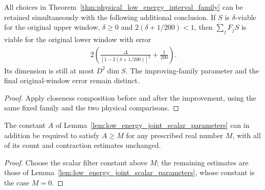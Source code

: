 \begin{corollary}
    \label{cor:physical_original_low_energy_interval_family}
    \leanok
    All choices in Theorem~\ref{thm:physical_low_energy_interval_family}
    can be retained simultaneously with the following additional conclusion.
    If $S$ is $\delta$-viable for the original upper window,
    $\delta\ge0$ and $2(\delta+1/200)<1$, then $\sum_jF_jS$ is viable
    for the original lower window with error
    \begin{align*}
        2\left(\frac{\Delta}{[1-2(\delta+1/200)]^2}+\frac1{200}\right).
    \end{align*}
    Its dimension is still at most $D^2\dim S$. The improving-family
    parameter and the final original-window error remain distinct.
\end{corollary}
\begin{proof}
    \leanok
    Apply closeness composition before and after the improvement, using
    the same fixed family and the two physical comparisons.
\end{proof}

\begin{lemma}
    \label{lem:low_energy_joint_scalar_parameters_above}
    \leanok
    The constant $A$ of Lemma~\ref{lem:low_energy_joint_scalar_parameters}
    can in addition be required to satisfy $A\ge M$ for any prescribed real
    number $M$, with all of its count and contraction estimates unchanged.
\end{lemma}
\begin{proof}\leanok
    Choose the scalar filter constant above $M$; the remaining estimates
    are those of Lemma~\ref{lem:low_energy_joint_scalar_parameters}, whose
    constant is the case $M=0$.
\end{proof}
